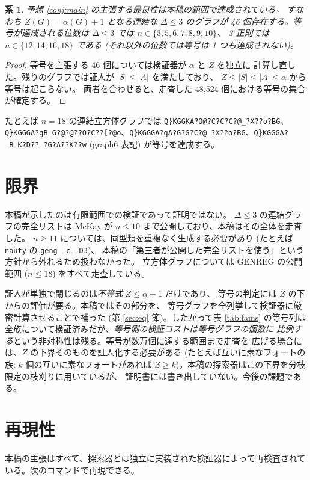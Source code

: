 \documentclass[paper=a4,fontsize=10.5pt,jafontsize=10.5pt]{jlreq}
\theoremstyle{plain}
\newtheorem{corollary}[theorem]{系}
\theoremstyle{definition}
\begin{document}
\begin{corollary}
予想 \ref{conj:main} の主張する最良性は本稿の範囲で達成されている。
すなわち $Z(G) = \alpha(G)+1$ となる連結な $\Delta \le 3$ のグラフが
46 個存在する。等号が達成される位数は
$\Delta \le 3$ では $n \in \{3, 5, 6, 7, 8, 9, 10\}$、
3-正則では $n \in \{12, 14, 16, 18\}$ である
(それ以外の位数では等号は 1 つも達成されない)。
\end{corollary}

\begin{proof}
等号を主張する 46 個については検証器が $\alpha$ と $Z$ を独立に
計算し直した。残りのグラフでは証人が $|S| \le |A|$ を満たしており、
$Z \le |S| \le |A| \le \alpha$ から等号は起こらない。
両者を合わせると、走査した 48,524 個における等号の集合が確定する。
\end{proof}

たとえば $n = 18$ の連結立方体グラフでは \texttt{Q\}KGGKA?O@?C?C?C?@\_?X??o?BG}、\texttt{Q\}KGGGA?gB\_G?@?@??O?C??[?@o}、\texttt{Q\}KGGGA?gA?G?G?C?@\_?X??o?BG}、\texttt{Q\}KGGGA?\_B\_K?D??\_?G?A??K??w} (graph6 表記) が等号を達成する。

\section{限界}

本稿が示したのは有限範囲での検証であって証明ではない。
$\Delta \le 3$ の連結グラフの完全リストは McKay \cite{mckay} が
$n \le 10$ まで公開しており、本稿はその全体を走査した。
$n \ge 11$ については、同型類を重複なく生成する必要があり
(たとえば \texttt{nauty} の \texttt{geng -c -D3})、
本稿の「第三者が公開した完全リストを使う」という方針から外れるため扱わなかった。
立方体グラフについては GENREG \cite{genreg} の公開範囲
($n \le 18$) をすべて走査している。

証人が単独で閉じるのは\emph{不等式} $Z \le \alpha+1$ だけであり、
等号の判定には $Z$ の下からの評価が要る。本稿ではその部分を、
等号グラフを全列挙して検証器に厳密計算させることで補った
(第 \ref{sec:eq} 節)。したがって表 \ref{tab:fams} の等号列は
全族について検証済みだが、\emph{等号側の検証コストは等号グラフの個数に
比例する}という非対称性は残る。等号が数万個に達する範囲まで走査を
広げる場合には、$Z$ の下界そのものを証人化する必要がある
(たとえば互いに素なフォートの族: $k$ 個の互いに素なフォートがあれば
$Z \ge k$)。本稿の探索器はこの下界を分枝限定の枝刈りに用いているが、
証明書には書き出していない。今後の課題である。


\section*{再現性}
本稿の主張はすべて、探索器とは独立に実装された検証器によって再検査されている。次のコマンドで再現できる。
\end{document}
